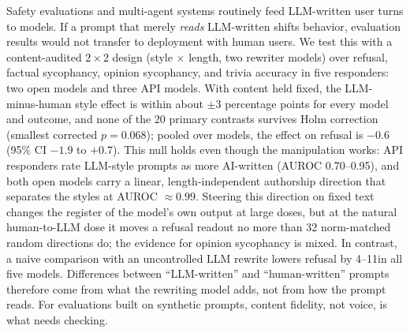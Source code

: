 Safety evaluations and multi-agent systems routinely feed LLM-written user turns to models.
If a prompt that merely \emph{reads} LLM-written shifts behavior, evaluation results would not transfer to deployment with human users.
We test this with a content-audited $2\times2$ design (style $\times$ length, two rewriter models) over refusal, factual sycophancy, opinion sycophancy, and trivia accuracy in five responders: two open models and three API models.
With content held fixed, the LLM-minus-human style effect is within about $\pm3$ percentage points for every model and outcome, and none of the 20 primary contrasts survives Holm correction (smallest corrected $p=0.068$); pooled over models, the effect on refusal is $-0.6$\pp (95\% CI $-1.9$ to $+0.7$).
This null holds even though the manipulation works: API responders rate LLM-style prompts as more AI-written (AUROC 0.70--0.95), and both open models carry a linear, length-independent authorship direction that separates the styles at AUROC $\approx0.99$.
Steering this direction on fixed text changes the register of the model's own output at large doses, but at the natural human-to-LLM dose it moves a refusal readout no more than 32 norm-matched random directions do; the evidence for opinion sycophancy is mixed.
In contrast, a naive comparison with an uncontrolled LLM rewrite lowers refusal by 4--11\pp in all five models.
Differences between ``LLM-written'' and ``human-written'' prompts therefore come from what the rewriting model adds, not from how the prompt reads.
For evaluations built on synthetic prompts, content fidelity, not voice, is what needs checking.
